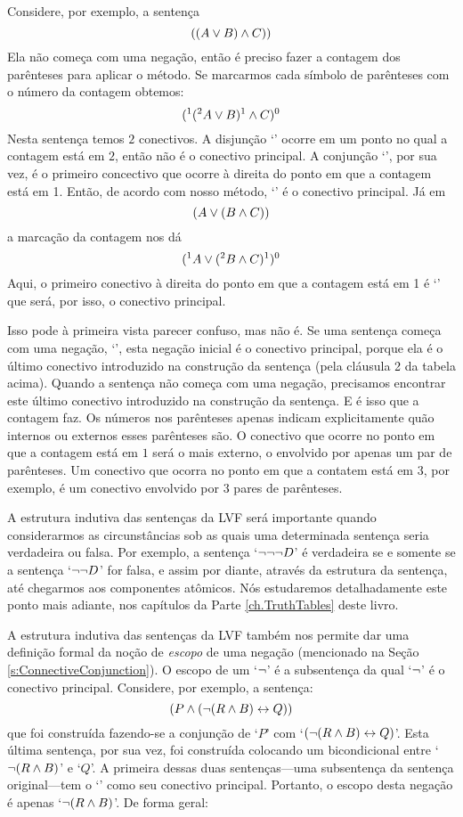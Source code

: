 Considere, por exemplo, a sentença
$$((A \vee B) \wedge C))$$
Ela não começa com uma negação, então é preciso fazer a contagem dos parênteses para aplicar o método.
Se marcarmos cada símbolo de parênteses com o número da contagem obtemos:
$$(^1 (^2 A \vee B)^1 \wedge C)^0$$
Nesta sentença temos $2$ conectivos.
A disjunção `\eor' ocorre em um ponto no qual a contagem está em $2$, então não é o conectivo principal.
A conjunção `\eand', por sua vez, é o primeiro concectivo que ocorre à direita do ponto em que a contagem está em 1.
Então, de acordo com nosso método, `\eand' é o conectivo principal.
Já em
$$(A \vee (B \wedge C))$$
a marcação da contagem nos dá
$$(^1 A \vee (^2 B \wedge C)^1 )^0$$
Aqui, o primeiro conectivo à direita do ponto em que a contagem está em 1 é `\eor' que será, por isso, o conectivo principal.

Isso pode à primeira vista parecer confuso, mas não é.
Se uma sentença começa com uma negação, `\enot', esta negação inicial é o conectivo principal, porque ela é o último conectivo introduzido na construção da sentença (pela cláusula 2 da tabela acima).
Quando a sentença não começa com uma negação, precisamos encontrar este último conectivo introduzido na construção da sentença.
E é isso que a contagem faz.
Os números nos parênteses apenas indicam explicitamente quão internos ou externos esses parênteses são.
O conectivo que ocorre no ponto em que a contagem está em $1$ será o mais externo, o envolvido por apenas um par de parênteses.
Um conectivo que ocorra no ponto em que a contatem está em $3$, por exemplo, é um conectivo envolvido por 3 pares de parênteses.
 
A estrutura indutiva das sentenças da LVF será importante quando considerarmos as circunstâncias sob as quais uma determinada sentença seria verdadeira ou falsa.
Por exemplo, a sentença `$\neg\neg\neg D$' é verdadeira se e somente se a sentença `$\neg\neg D$' for falsa, e assim por diante, através da estrutura da sentença, até chegarmos aos componentes atômicos.
Nós estudaremos detalhadamente este ponto mais adiante, nos capítulos da Parte \ref{ch.TruthTables} deste livro.

A estrutura indutiva das sentenças da LVF também nos permite dar uma definição formal da noção de \emph{escopo} de uma negação (mencionado na Seção  \ref{s:ConnectiveConjunction}).
O escopo de um `$\neg$' é a subsentença da qual `$\neg$' é o conectivo principal.
Considere, por exemplo, a sentença:
$$(P \wedge (\neg (R \wedge B) \leftrightarrow Q))$$
que foi construída fazendo-se a conjunção de `$P$' com \mbox{`$(\neg(R \wedge B) \leftrightarrow Q)$'}.
Esta última sentença, por sua vez, foi construída colocando um bicondicional entre `$\neg(R \wedge B)$' e `$Q$'.
A primeira dessas duas sentenças---uma subsentença da sentença original---tem o `\enot' como seu conectivo principal.
Portanto, o escopo desta negação é apenas `$\neg(R \wedge B)$'.
De forma geral:

